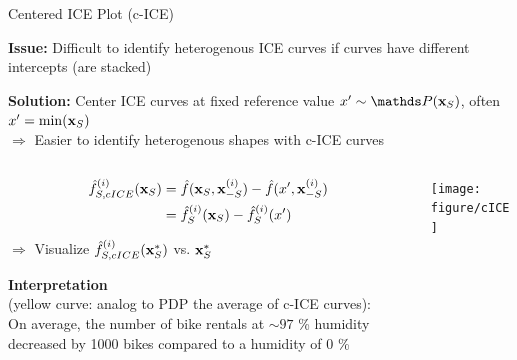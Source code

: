 \documentclass[11pt,compress,t,notes=noshow, aspectratio=169, xcolor=table]{beamer}
\begin{document}
\begin{frame}{Centered ICE Plot (c-ICE) }

\textbf{Issue:} Difficult to identify heterogenous ICE curves if curves have different intercepts (are stacked)

\textbf{Solution:} Center ICE curves at fixed reference value $x' \sim \P(\xv_S)$, often $x' = \min(\mathbf{x}_S)$\\
$\Rightarrow$ Easier to identify heterogenous shapes with c-ICE curves
\vspace{-0.2cm}
\begin{columns}[c, totalwidth=\textwidth]
\begin{column}{0.45\textwidth}
$$\begin{aligned}
\hat{f}_{S, cICE}^{(i)}(\mathbf{x}_S)
&= \hat{f}(\mathbf{x}_S, \mathbf{x}^{(i)}_{-S}) - \hat{f}(x', \mathbf{x}^{(i)}_{-S}) \\
&= \hat{f}_{S}^{(i)}(\mathbf{x}_S) - \hat{f}_{S}^{(i)}(x')
\end{aligned}$$

$\Rightarrow$ Visualize $\hat{f}_{S, cICE}^{(i)}(\mathbf{x}_S^*)$ vs. $\mathbf{x}_S^*$

\lz
\pause
\textbf{Interpretation} \\
(yellow curve: analog to PDP the average of c-ICE curves): \\
On average, the number of bike rentals at $\sim 97$ \% humidity decreased by 1000 bikes compared to a humidity of 0 \%
\end{column}
\begin{column}{0.54\textwidth}
\begin{center}
\texttt{[image: figure/cICE]}
\end{center}
\end{column}
\end{columns}


\end{frame}
\end{document}
